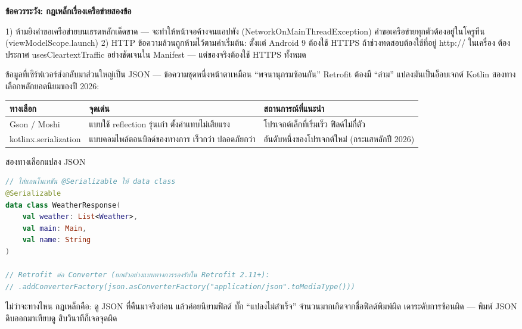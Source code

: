 \textbf{ข้อควรระวัง: กฎเหล็กเรื่องเครือข่ายสองข้อ}\par

1) ห้ามยิงคำขอเครือข่ายบนเธรดหลักเด็ดขาด — จะทำให้หน้าจอค้างจนแอปพัง (NetworkOnMainThreadException) คำขอเครือข่ายทุกตัวต้องอยู่ในโครูทีน (viewModelScope.launch) 2) HTTP ข้อความล้วนถูกห้ามไว้ตามค่าเริ่มต้น: ตั้งแต่ Android 9 ต้องใช้ HTTPS ถ้าช่วงทดสอบต้องใช้ที่อยู่ http:// ในเครื่อง ต้องประกาศ usesCleartextTraffic อย่างชัดเจนใน Manifest — แต่ของจริงต้องใช้ HTTPS ทั้งหมด


ข้อมูลที่เซิร์ฟเวอร์ส่งกลับมาส่วนใหญ่เป็น JSON — ข้อความชุดหนึ่งหน้าตาเหมือน “พจนานุกรมซ้อนกัน” Retrofit ต้องมี “ล่าม” แปลงมันเป็นอ็อบเจกต์ Kotlin สองทางเลือกหลักยอดนิยมของปี 2026:

\begin{center}
\begin{tabularx}{\linewidth}{|X|X|X|}
\hline
\textbf{ทางเลือก} & \textbf{จุดเด่น} & \textbf{สถานการณ์ที่แนะนำ} \tabularnewline
\hline
Gson / Moshi & แบบใช้ reflection รุ่นเก๋า ตั้งค่าแทบไม่เสียแรง & โปรเจกต์เล็กที่เริ่มเร็ว ฟิลด์ไม่กี่ตัว \tabularnewline
kotlinx.serialization & แบบคอมไพล์ตอนบิลด์ของทางการ เร็วกว่า ปลอดภัยกว่า & อันดับหนึ่งของโปรเจกต์ใหม่ (กระแสหลักปี 2026) \tabularnewline
\hline
\end{tabularx}
\end{center}

\begin{center}\small\color{gray}สองทางเลือกแปลง JSON\end{center}

\begin{lstlisting}[language=Kotlin]
// ใส่แอนโนเทชัน @Serializable ให้ data class
@Serializable
data class WeatherResponse(
    val weather: List<Weather>,
    val main: Main,
    val name: String
)

// Retrofit ต่อ Converter (ยกตัวอย่างแบบทางการรองรับใน Retrofit 2.11+):
// .addConverterFactory(json.asConverterFactory("application/json".toMediaType()))
\end{lstlisting}

ไม่ว่าจะทางไหน กฎเหล็กคือ: ดู JSON ที่คืนมาจริงก่อน แล้วค่อยนิยามฟิลด์ บั๊ก “แปลงไม่สำเร็จ” จำนวนมากเกิดจากชื่อฟิลด์พิมพ์ผิด เดาระดับการซ้อนผิด — พิมพ์ JSON ดิบออกมาเทียบดู สิบวินาทีก็เจอจุดผิด



